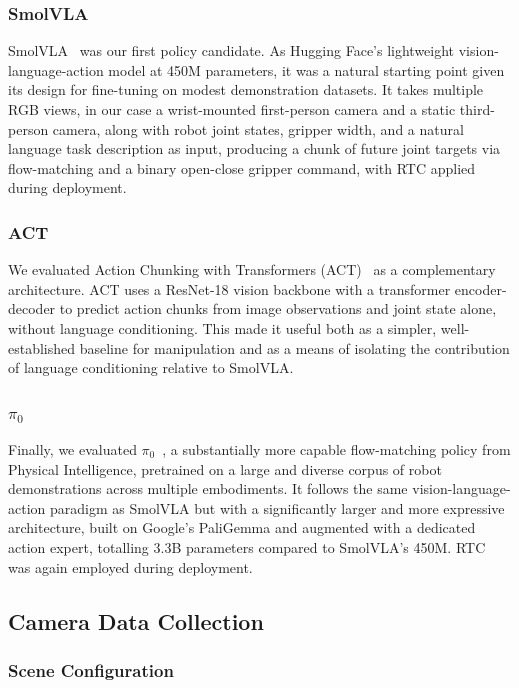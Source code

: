 \documentclass[conference]{IEEEtran}
\begin{document}
\subsubsection{SmolVLA}
SmolVLA~\cite{shukor2025smolvlavisionlanguageactionmodelaffordable} was our first policy candidate. As Hugging Face's lightweight vision-language-action model at 450M parameters, it was a natural starting point given its design for fine-tuning on modest demonstration datasets. It takes multiple RGB views, in our case a wrist-mounted first-person camera and a static third-person camera, along with robot joint states, gripper width, and a natural language task description as input, producing a chunk of future joint targets via flow-matching 
and a binary open-close gripper command, with RTC applied during deployment.

\subsubsection{ACT}
We evaluated Action Chunking with Transformers (ACT)~\cite{zhao2023learningfinegrainedbimanualmanipulation} as a complementary architecture. ACT uses a ResNet-18 vision backbone with a transformer encoder-decoder to predict action chunks from image observations and joint state alone, without language conditioning. This made it useful both as a simpler, well-established baseline for manipulation and as a means of isolating the contribution of language conditioning relative to SmolVLA.

\subsubsection{$\pi_0$}
Finally, we evaluated $\pi_0$~\cite{black2026pi0visionlanguageactionflowmodel}, a substantially more capable flow-matching policy from Physical Intelligence, pretrained on a large and diverse corpus of robot demonstrations across multiple embodiments. It follows the same vision-language-action paradigm as SmolVLA but with a significantly larger and more expressive architecture, built on Google's PaliGemma and augmented with a dedicated action expert, totalling 3.3B parameters compared to SmolVLA's 450M. RTC was again employed during deployment.

\subsection{Camera Data Collection}

\subsubsection{Scene Configuration}
\end{document}
